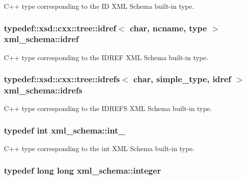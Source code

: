 C++ type corresponding to the I\-D X\-M\-L Schema built-\/in type. 

\hypertarget{namespacexml__schema_a50fe7403f3e6be3634976c84c1ea1f8c}{
\subsubsection[{idref}]{\setlength{\rightskip}{0pt plus 5cm}typedef\-::xsd\-::cxx\-::tree\-::idref$<$ char, {\bf ncname}, {\bf type} $>$ {\bf xml\-\_\-schema\-::idref}}}\label{namespacexml__schema_a50fe7403f3e6be3634976c84c1ea1f8c}


C++ type corresponding to the I\-D\-R\-E\-F X\-M\-L Schema built-\/in type. 

\hypertarget{namespacexml__schema_aac27fe5af9a5b2ee009fd3c9abe3abe9}{
\subsubsection[{idrefs}]{\setlength{\rightskip}{0pt plus 5cm}typedef\-::xsd\-::cxx\-::tree\-::idrefs$<$ char, {\bf simple\-\_\-type}, {\bf idref} $>$ {\bf xml\-\_\-schema\-::idrefs}}}\label{namespacexml__schema_aac27fe5af9a5b2ee009fd3c9abe3abe9}


C++ type corresponding to the I\-D\-R\-E\-F\-S X\-M\-L Schema built-\/in type. 

\hypertarget{namespacexml__schema_acfa24ac68e1a188e7f44c36f7a158bf4}{
\subsubsection[{int\-\_\-}]{\setlength{\rightskip}{0pt plus 5cm}typedef int {\bf xml\-\_\-schema\-::int\-\_\-}}}\label{namespacexml__schema_acfa24ac68e1a188e7f44c36f7a158bf4}


C++ type corresponding to the int X\-M\-L Schema built-\/in type. 

\hypertarget{namespacexml__schema_aaaea7c8ce4dfbe26cc52c91c29c97b7c}{
\subsubsection[{integer}]{\setlength{\rightskip}{0pt plus 5cm}typedef long long {\bf xml\-\_\-schema\-::integer}}}\label{namespacexml__schema_aaaea7c8ce4dfbe26cc52c91c29c97b7c}


